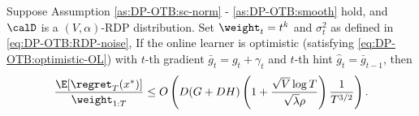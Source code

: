 \begin{theorem}
\label{thm:DP-OTB:optimistic}
Suppose Assumption \ref{as:DP-OTB:sc-norm} - \ref{as:DP-OTB:smooth} hold, and $\calD$ is a $(V,\alpha)$-RDP distribution. Set $\weight_t=t^k$ and $\sigma_t^2$ as defined in \eqref{eq:DP-OTB:RDP-noise},
If the online learner is optimistic (satisfying \eqref{eq:DP-OTB:optimistic-OL}) with $t$-th gradient $\bar{g}_t=g_t+\gamma_t$ and $t$-th hint $\hat{g}_t=\bar{g}_{t-1}$, then
\begin{align*}
    \frac{\E[\regret_T(x^*)]}{\weight_{1:T}} 
    \leq O\left( D(G+DH)\left(1+\frac{\sqrt{V}\log T}{\sqrt{\lambda}\rho}\right)\frac{1}{T^{3/2}} \right).
\end{align*}
\end{theorem}